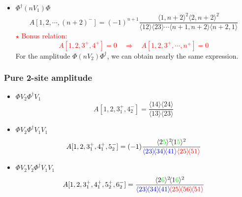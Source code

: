 \documentclass{beamer}
\newcommand{\avg}[1]{\langle #1 \rangle}
\newcommand{\mdavg}[2]{\langle #1 \rangle\!\langle #2 \rangle}
\begin{document}
\begin{frame}
    \begin{itemize}
        \item $\Phi^\dagger (nV_1)\Phi$
            \begin{equation*}
                A[1,2,\cdots,(n+2)^-]=(-1)^{n+1}\frac{\avg{1,n+2}^2\avg{2,n+2}^2}{\mdavg{12}{23}\cdots\mdavg{n+1,n+2}{n+2,1}}
            \end{equation*}
            \textcolor{red}{$\star$ Bonus relation: \begin{equation*}
                A[1,2,3^+,4^+]=0\quad \Rightarrow  \quad A[1,2,3^+,\cdots,n^+]=0 \end{equation*}}
        For the amplitude $\Phi (nV_2)\Phi^\dagger$, we can obtain nearly the same expression.
    \end{itemize}
\end{frame}

\begin{frame}
    \frametitle{Pure 2-site amplitude}
    \begin{itemize}
        \item $\Phi V_2 \Phi^\dagger V_1$
        \begin{equation*}
            A[1,2,3_1^+,4_2^-]=\frac{\mdavg{14}{24}}{\mdavg{13}{23}}
        \end{equation*}
        \item $\Phi V_2 \Phi^\dagger V_1V_1$
        \begin{equation*}
            A[1,2,3_1^+,4_1^+,5_2^-]=(-1)\frac{\avg{2\textcolor{green}{5}}^2\!\avg{1\textcolor{green}{5}}^2}{\textcolor{blue}{\mdavg{23}{34}\!\avg{41}}\textcolor{red}{\mdavg{25}{51}}}
        \end{equation*}
        \item $\Phi V_2V_2 \Phi^\dagger V_1V_1$
        \begin{equation*}
            A[1,2,3_1^+,4_1^+,5_2^+,6_2^-]=\frac{\avg{2\textcolor{green}{6}}^2\!\avg{1\textcolor{green}{6}}^2}{\textcolor{blue}{\mdavg{23}{34}\!\avg{41}}\!\textcolor{red}{\mdavg{25}{56}\!\avg{51}}}
        \end{equation*}       
    \end{itemize}
\end{frame}
\end{document}
